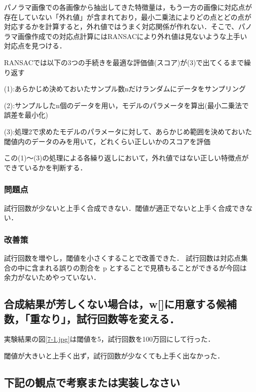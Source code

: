 \documentclass[11pt]{jarticle}
\begin{document}
パノラマ画像での各画像から抽出してきた特徴量は，もう一方の画像に対応点が存在していない「外れ値」が含まれており，最小二乗法によりどの点とどの点が対応するかを計算すると，外れ値ではうまく対応関係が作れない．そこで、パノラマ画像作成での対応点計算にはRANSACにより外れ値は見ないような上手い対応点を見つける．

RANSACでは以下の3つの手続きを最適な評価値(スコア)が(3)で出てくるまで繰り返す


(1):あらかじめ決めておいたサンプル数nだけランダムにデータをサンプリング


(2):サンプルしたn個のデータを用い，モデルのパラメータを算出(最小二乗法で誤差を最小化)


(3):処理2で求めたモデルのパラメータに対して、あらかじめ範囲を決めておいた閾値内のデータのみを用いて，どれくらい正しいかのスコアを評価

この(1)～(3)の処理による各繰り返しにおいて，外れ値ではない正しい特徴点ができているかを判断する．

\subsubsection{問題点}
試行回数が少ないと上手く合成できない．閾値が適正でないと上手く合成できない．

\subsubsection{改善策}
試行回数を増やし，閾値を小さくすることで改善できた．
試行回数は対応点集合の中に含まれる誤りの割合を p とすることで見積もることができるが今回は余力がないためやっていない．

\subsection{合成結果が芳しくない場合は，w[]に用意する候補数，「重なり」，試行回数等を変える．}

実験結果の図\ref{7-1.jpg}は閾値を5，試行回数を100万回にして行った．

閾値が大きいと上手く出ず，試行回数が少なくても上手く出なかった．

\subsection{下記の観点で考察または実装しなさい}
\end{document}
